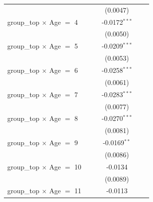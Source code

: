 \begin{table}[htbp]
\begin{tabular}{lccccc}
                                       &                       &                       & (0.0047)        &                &   \\   
      group\_top $\times$ Age $=$ 4    &                       &                       & -0.0172$^{***}$ &                &   \\   
                                       &                       &                       & (0.0050)        &                &   \\   
      group\_top $\times$ Age $=$ 5    &                       &                       & -0.0209$^{***}$ &                &   \\   
                                       &                       &                       & (0.0053)        &                &   \\   
      group\_top $\times$ Age $=$ 6    &                       &                       & -0.0258$^{***}$ &                &   \\   
                                       &                       &                       & (0.0061)        &                &   \\   
      group\_top $\times$ Age $=$ 7    &                       &                       & -0.0283$^{***}$ &                &   \\   
                                       &                       &                       & (0.0077)        &                &   \\   
      group\_top $\times$ Age $=$ 8    &                       &                       & -0.0270$^{***}$ &                &   \\   
                                       &                       &                       & (0.0081)        &                &   \\   
      group\_top $\times$ Age $=$ 9    &                       &                       & -0.0169$^{**}$  &                &   \\   
                                       &                       &                       & (0.0086)        &                &   \\   
      group\_top $\times$ Age $=$ 10   &                       &                       & -0.0134         &                &   \\   
                                       &                       &                       & (0.0089)        &                &   \\   
      group\_top $\times$ Age $=$ 11   &                       &                       & -0.0113         &                &   \\   

\end{tabular}
\end{table}
